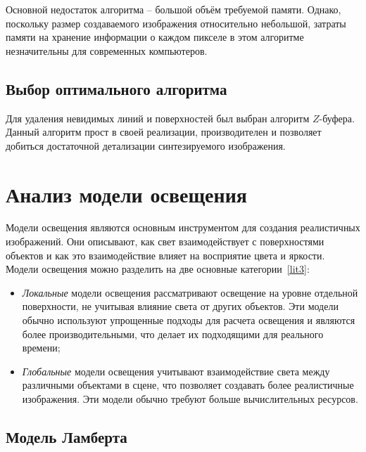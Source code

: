 Основной недостаток алгоритма -- большой объём требуемой памяти. Однако, поскольку размер создаваемого изображения относительно небольшой, затраты памяти на хранение информации о каждом пикселе в этом алгоритме незначительны для современных компьютеров.

\subsection{Выбор оптимального алгоритма}

Для удаления невидимых линий и поверхностей был выбран алгоритм $Z$-буфера. Данный алгоритм прост в своей реализации, производителен и позволяет добиться достаточной детализации синтезируемого изображения.

\section{Анализ модели освещения}

Модели освещения являются основным инструментом для создания реалистичных изображений. Они описывают, как свет взаимодействует с поверхностями объектов и как это взаимодействие влияет на восприятие цвета и яркости. Модели освещения можно разделить на две основные категории~\ref{lit3}:
\begin{itemize}[label=--]
	\item \textit{Локальные} модели освещения рассматривают освещение на уровне отдельной поверхности, не учитывая влияние света от других объектов. Эти модели обычно используют упрощенные подходы для расчета освещения и являются более производительными, что делает их подходящими для реального времени;
	\item \textit{Глобальные} модели освещения учитывают взаимодействие света между различными объектами в сцене, что позволяет создавать более реалистичные изображения. Эти модели обычно требуют больше вычислительных ресурсов.
\end{itemize}

\subsection{Модель Ламберта}

